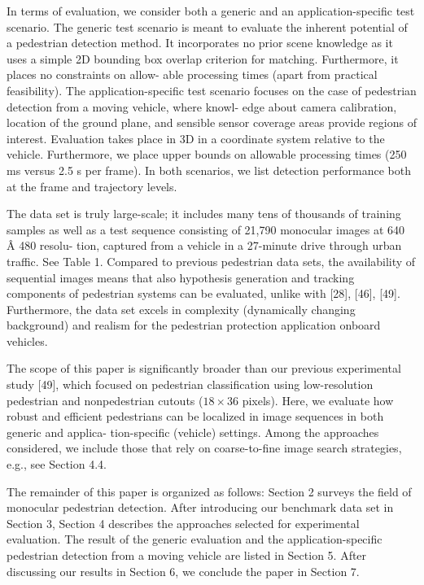 In terms of evaluation, we consider both a generic and an
application-specific test scenario. The generic test scenario
is meant to evaluate the inherent potential of a pedestrian
detection method. It incorporates no prior scene knowledge
as it uses a simple 2D bounding box overlap criterion for
matching. Furthermore, it places no constraints on allow-
able processing times (apart from practical feasibility). The
application-specific test scenario focuses on the case of
pedestrian detection from a moving vehicle, where knowl-
edge about camera calibration, location of the ground plane,
and sensible sensor coverage areas provide regions of
interest. Evaluation takes place in 3D in a coordinate system
relative to the vehicle. Furthermore, we place upper bounds
on allowable processing times (250 ms versus 2.5 s per
frame). In both scenarios, we list detection performance
both at the frame and trajectory levels.

The data set is truly large-scale; it includes many tens of
thousands of training samples as well as a test sequence
consisting of 21,790 monocular images at 640 Â 480 resolu-
tion, captured from a vehicle in a 27-minute drive through
urban traffic. See Table 1. Compared to previous pedestrian
data sets, the availability of sequential images means that
also hypothesis generation and tracking components of
pedestrian systems can be evaluated, unlike with [28], [46],
[49]. Furthermore, the data set excels in complexity
(dynamically changing background) and realism for the
pedestrian protection application onboard vehicles.

The scope of this paper is significantly broader than our
previous experimental study [49], which focused on
pedestrian classification using low-resolution pedestrian
and nonpedestrian cutouts ($18\times36$ pixels). Here, we
evaluate how robust and efficient pedestrians can be
localized in image sequences in both generic and applica-
tion-specific (vehicle) settings. Among the approaches
considered, we include those that rely on coarse-to-fine
image search strategies, e.g., see Section 4.4.

The remainder of this paper is organized as follows:
Section 2 surveys the field of monocular pedestrian detection.
After introducing our benchmark data set in Section 3,
Section 4 describes the approaches selected for experimental
evaluation. The result of the generic evaluation and the
application-specific pedestrian detection from a moving
vehicle are listed in Section 5. After discussing our results
in Section 6, we conclude the paper in Section 7.
